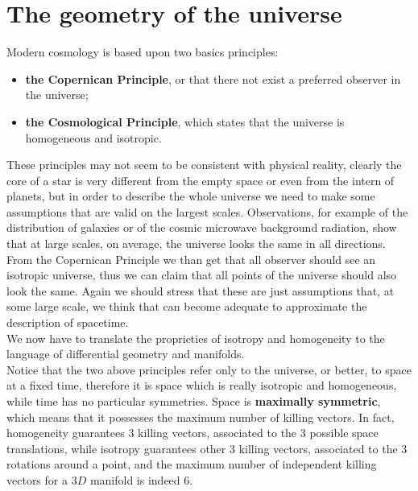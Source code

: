 \section{The geometry of the universe}
Modern cosmology is based upon two basics principles:
\begin{itemize}
    \item \textbf{the Copernican Principle}, or that there not exist a preferred observer in the universe;
    \item \textbf{the Cosmological Principle}, which states that the universe is homogeneous and isotropic.
\end{itemize}
These principles may not seem to be consistent with physical reality, clearly the core of a star is very different from the empty space or even from the intern of planets, but in order to describe the whole universe we need to make some assumptions that are valid on the largest scales. Observations, for example of the distribution of galaxies or of the cosmic microwave background radiation, show that at large scales, on average, the universe looks the same in all directions. From the Copernican Principle we than get that all observer should see an isotropic universe, thus we can claim that all points of the universe should also look the same. Again we should stress that these are just assumptions that, at some large scale, we think that can become adequate to approximate the description of spacetime.\\

We now have to translate the proprieties of isotropy and homogeneity to the language of differential geometry and manifolds.\\ Notice that the two above principles refer only to the universe, or better, to space at a fixed time, therefore it is space which is really isotropic and homogeneous, while time has no particular symmetries.
Space is \textbf{maximally symmetric}, which means that it possesses the maximum number of killing vectors. In fact, homogeneity guarantees 3 killing vectors, associated to the 3 possible space translations, while isotropy guarantees other 3 killing vectors, associated to the 3 rotations around a point, and the maximum number of independent killing vectors for a $3D$ manifold is indeed 6.
